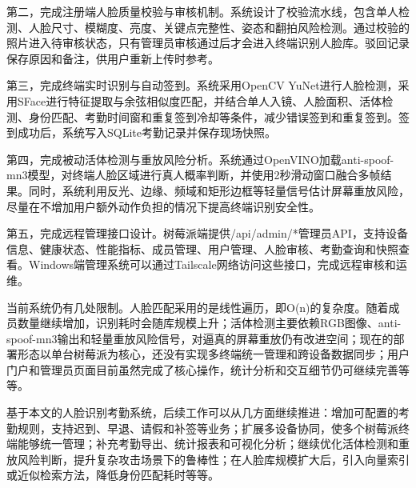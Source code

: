 \documentclass[UTF8]{heuthesis}
\begin{document}
第二，完成注册端人脸质量校验与审核机制。系统设计了校验流水线，包含单人检测、人脸尺寸、模糊度、亮度、关键点完整性、姿态和翻拍风险检测。通过校验的照片进入待审核状态，只有管理员审核通过后才会进入终端识别人脸库。驳回记录保存原因和备注，供用户重新上传时参考。

第三，完成终端实时识别与自动签到。系统采用OpenCV YuNet进行人脸检测，采用SFace进行特征提取与余弦相似度匹配，并结合单人入镜、人脸面积、活体检测、身份匹配、考勤时间窗和重复签到冷却等条件，减少错误签到和重复签到。签到成功后，系统写入SQLite考勤记录并保存现场快照。

第四，完成被动活体检测与重放风险分析。系统通过OpenVINO加载anti-spoof-mn3模型，对终端人脸区域进行真人概率判断，并使用2秒滑动窗口融合多帧结果。同时，系统利用反光、边缘、频域和矩形边框等轻量信号估计屏幕重放风险，尽量在不增加用户额外动作负担的情况下提高终端识别安全性。

第五，完成远程管理接口设计。树莓派端提供/api/admin/*管理员API，支持设备信息、健康状态、性能指标、成员管理、用户管理、人脸审核、考勤查询和快照查看。Windows端管理系统可以通过Tailscale网络访问这些接口，完成远程审核和运维。

当前系统仍有几处限制。人脸匹配采用的是线性遍历，即O(n)的复杂度。随着成员数量继续增加，识别耗时会随库规模上升；活体检测主要依赖RGB图像、anti-spoof-mn3输出和轻量重放风险信号，对逼真的屏幕重放仍有改进空间；现在的部署形态以单台树莓派为核心，还没有实现多终端统一管理和跨设备数据同步；用户门户和管理员页面目前虽然完成了核心操作，统计分析和交互细节仍可继续完善等等。

基于本文的人脸识别考勤系统，后续工作可以从几方面继续推进：增加可配置的考勤规则，支持迟到、早退、请假和补签等业务；扩展多设备协同，使多个树莓派终端能够统一管理；补充考勤导出、统计报表和可视化分析；继续优化活体检测和重放风险判断，提升复杂攻击场景下的鲁棒性；在人脸库规模扩大后，引入向量索引或近似检索方法，降低身份匹配耗时等等。
\end{document}
